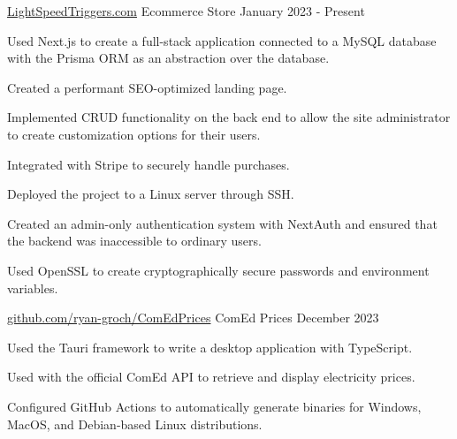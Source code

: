 

\begin{cventries}

  \cventry
    {\href{https://lightspeedtriggers.com}{LightSpeedTriggers.com}} %
    {Ecommerce Store} %
    {January 2023 - Present} %
    {} %
    {
      \begin{cvitems} %
        \item {Used Next.js to create a full-stack application connected to a MySQL database with the Prisma ORM as an abstraction over the database.}
        \item {Created a performant SEO-optimized landing page.}
        \item {Implemented CRUD functionality on the back end to allow the site administrator to create customization options for their users.}
        \item {Integrated with Stripe to securely handle purchases.}
        \item {Deployed the project to a Linux server through SSH.}
        \item {Created an admin-only authentication system with NextAuth and ensured that the backend was inaccessible to ordinary users.}
        \item {Used OpenSSL to create cryptographically secure passwords and environment variables.}
      \end{cvitems}
    }


  \cventry
  {\href{https://github.com/ryan-groch/ComEdPrices}{github.com/ryan-groch/ComEdPrices}} %
  {ComEd Prices} %
  {December 2023} %
  {} %
  {
    \begin{cvitems} %
      \item {Used the Tauri framework to write a desktop application with TypeScript.}
      \item {Used with the official ComEd API to retrieve and display electricity prices.}
      \item {Configured GitHub Actions to automatically generate binaries for Windows, MacOS, and Debian-based Linux distributions.}
    \end{cvitems}
  }


\end{cventries}
